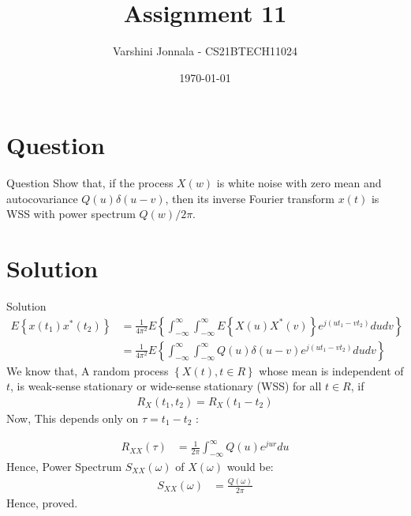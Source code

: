 \documentclass{beamer}
\title{Assignment 11}
\author{Varshini Jonnala - CS21BTECH11024}
\date{\today}
\providecommand{\cbrak}[1]{\ensuremath{\left\{#1\right\}}}
\providecommand{\brak}[1]{\ensuremath{\left(#1\right)}}
\begin{document}
\begin{frame}
    \titlepage 
\end{frame}

\section{Question}
\begin{frame}{Question}
Show that, if the process $X(w)$ is white noise with zero mean and autocovariance $Q(u)\delta(u - v)$, then its inverse Fourier transform $x(t)$ is WSS with power spectrum $Q(w)/2\pi$.
\end{frame}

\section{Solution}
\begin{frame}[allowframebreaks]{Solution}
    \begin{align}
        E\cbrak{x(t_1)x^*(t_2)} &=\frac{1}{4\pi^2} E\cbrak{\int_{-\infty}^\infty \int_{-\infty}^\infty  E\cbrak{X(u)X^*(v)} e^{j\brak{ut_1 - vt_2}} du dv }\\
        &= \frac{1}{4\pi^2} E\cbrak{\int_{-\infty}^\infty \int_{-\infty}^\infty  Q(u)\delta(u - v)  e^{j\brak{ut_1 - vt_2}} du dv }
    \end{align}
    We know that, A random process $\cbrak{X(t),t \in R}$ whose mean is independent of $t$, is weak-sense stationary or wide-sense stationary (WSS) for all $t \in R$, if
    \begin{align}
        R_X\brak{t_1,t_2}=R_X\brak{t_1 - t_2}
    \end{align}
\newpage
    Now, 
    This depends only on $\tau = t_1 - t_2$ :
   
    
    \begin{align}
        R_{XX}\brak{\tau} &= \frac{1}{2\pi} \int_{-\infty}^\infty Q(u) e^{jur} du
    \end{align}
    Hence, Power Spectrum $S_{XX}(\omega)$ of $X(\omega)$ would be:
    \begin{align}
         S_{XX} \brak{\omega} &= \frac{Q(\omega)}{2\pi}
    \end{align}
    Hence, proved.
\end{frame} 
\end{document}
